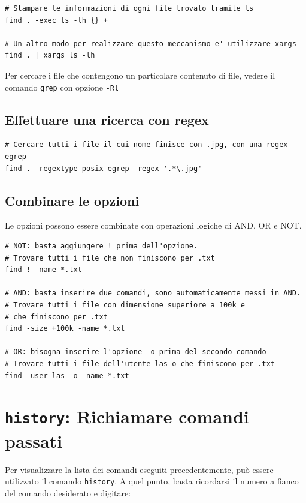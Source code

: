 \documentclass[a4paper]{report}
\newenvironment{info}{\begin{tcolorbox}[fonttitle=\sffamily\bfseries\large,title=Info,colframe=blue!75!white]}{\end{tcolorbox}}
\newenvironment{code}{\begin{tcolorbox}[size=small]}{\end{tcolorbox}}
\begin{document}
\begin{code}
\begin{lstlisting}
# Stampare le informazioni di ogni file trovato tramite ls
find . -exec ls -lh {} +

# Un altro modo per realizzare questo meccanismo e' utilizzare xargs
find . | xargs ls -lh
\end{lstlisting}
\end{code}

\begin{info}
Per cercare i file che contengono un particolare contenuto di file, vedere il comando \texttt{grep} con opzione \texttt{-Rl}
\end{info}

\subsection*{Effettuare una ricerca con regex}

\begin{code}
\begin{lstlisting}
# Cercare tutti i file il cui nome finisce con .jpg, con una regex egrep
find . -regextype posix-egrep -regex '.*\.jpg'
\end{lstlisting}
\end{code}

\subsection*{Combinare le opzioni}
Le opzioni possono essere combinate con operazioni logiche di AND, OR e NOT.

\begin{code}
\begin{lstlisting}
# NOT: basta aggiungere ! prima dell'opzione.
# Trovare tutti i file che non finiscono per .txt
find ! -name *.txt

# AND: basta inserire due comandi, sono automaticamente messi in AND.
# Trovare tutti i file con dimensione superiore a 100k e 
# che finiscono per .txt
find -size +100k -name *.txt

# OR: bisogna inserire l'opzione -o prima del secondo comando
# Trovare tutti i file dell'utente las o che finiscono per .txt
find -user las -o -name *.txt
\end{lstlisting}
\end{code}

\section{\texttt{history}: Richiamare comandi passati}
Per visualizzare la lista dei comandi eseguiti precedentemente, può essere utilizzato il comando \texttt{history}. A quel punto, basta ricordarsi il numero a fianco del comando desiderato e digitare:
\end{document}
